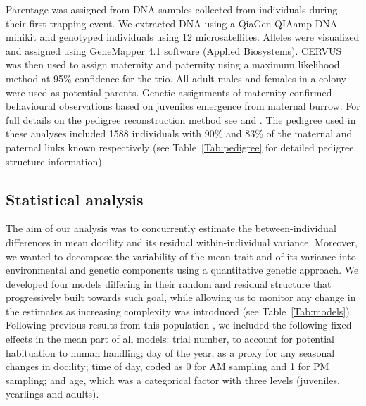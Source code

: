 \documentclass[a4paper,12pt,twoside]{article}
\begin{document}
	Parentage was assigned from DNA samples collected from individuals during their first trapping event.
	We extracted DNA using a QiaGen QIAamp DNA minikit and genotyped individuals using 12 microsatellites. 
	Alleles were visualized and assigned using GeneMapper 4.1 software (Applied Biosystems). 
	CERVUS \citep{kalinowski_revising_2007} was then used to assign maternity and paternity using a maximum likelihood method at 95\% confidence for the trio. All adult males and females in a colony were used as potential parents.
	Genetic assignments of maternity confirmed behavioural observations based on juveniles emergence from maternal burrow.
	For full details on the pedigree reconstruction method see \cite{olson_no_2012} and \cite{blumstein_heritability_2010}.
	The pedigree used in these analyses included 1588 individuals with 90\% and 83\% of the maternal and paternal links known respectively (see Table~\ref{Tab:pedigree} for detailed pedigree structure information).
	
	\subsection*{Statistical analysis}
	The aim of our analysis was to concurrently estimate the between-individual differences in mean docility and its residual within-individual variance. 
	Moreover, we wanted to decompose the variability of the mean trait and of its variance into environmental and genetic components using a quantitative genetic approach. 
	We developed four models differing in their random and residual structure that progressively built towards such goal, while allowing us to monitor any change in the estimates as increasing complexity was introduced (see Table~\ref{Tab:models}). 
	Following previous results from this population \citep{petelle_development_2013,petelle_heritability_2015}, we included the following fixed effects in the mean part of all models: trial number, to account for potential habituation to human handling; day of the year, as a proxy for any seasonal changes in docility; time of day, coded as 0 for AM sampling and 1 for PM sampling; and age, which was a categorical factor with three levels (juveniles, yearlings and adults).
	
\end{document}
